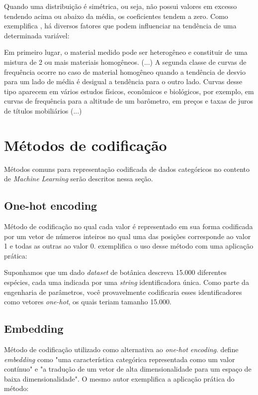 Quando uma distribuição é simétrica, ou seja, não possui valores em excesso tendendo acima ou abaixo da média, os coeficientes tendem a zero. Como exemplifica , há diversos fatores que podem influenciar na tendência de uma determinada variável:

\begin{citacao}
 Em primeiro lugar, o material medido pode ser heterogêneo e constituir de uma mistura de 2 ou mais materiais homogêneos. (...) A segunda classe de curvas de frequência ocorre no caso de material homogêneo quando a tendência de desvio para um lado de média é desigual a tendência para o outro lado. Curvas desse tipo aparecem em vários estudos físicos, econômicos e biológicos, por exemplo, em curvas de frequência para a altitude de um barômetro, em preços e taxas de juros de títulos mobiliários (...)
\end{citacao}

\section{Métodos de codificação}
Métodos comuns para representação codificada de dados categóricos no contento de \textit{Machine Learning} serão descritos nessa seção.

\subsection{One-hot encoding}
Método de codificação no qual cada valor é representado em sua forma codificada por um vetor de números inteiros no qual uma das posições corresponde ao valor 1 e todas as outras ao valor 0.  exemplifica o uso desse método com uma aplicação prática:

\begin{citacao}
Suponhamos que um dado \textit{dataset} de botânica descreva 15.000 diferentes espécies, cada uma indicada por uma \textit{string} identificadora única. Como parte da engenharia de parâmetros, você provavelmente codificaria esses identificadores como vetores \textit{one-hot}, os quais teriam tamanho 15.000.
\end{citacao}

\subsection{Embedding}
Método de codificação utilizado como alternativa ao \textit{one-hot encoding}.  define \textit{embedding} como "uma característica categórica representada como um valor contínuo" e "a tradução de um vetor de alta dimensionalidade para um espaço de baixa dimensionalidade". O mesmo autor exemplifica a aplicação prática do método:

